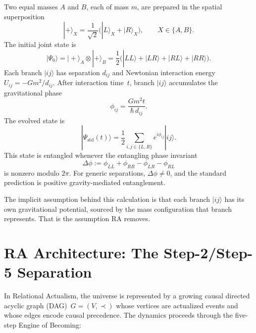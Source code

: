 \documentclass[12pt,a4paper]{article}
\begin{document}
Two equal masses $A$ and $B$, each of mass $m$, are prepared in the
spatial superposition
\begin{equation}
|{+}\rangle_X = \frac{1}{\sqrt{2}}
\bigl(|L\rangle_X + |R\rangle_X\bigr),
\qquad X \in \{A,B\}.
\end{equation}
The initial joint state is
\begin{equation}
|\Psi_0\rangle = |{+}\rangle_A \otimes |{+}\rangle_B
= \frac{1}{2}\bigl(|LL\rangle + |LR\rangle + |RL\rangle
+ |RR\rangle\bigr).
\end{equation}
Each branch $|ij\rangle$ has separation $d_{ij}$ and Newtonian
interaction energy $U_{ij} = -Gm^2/d_{ij}$. After interaction
time~$t$, branch $|ij\rangle$ accumulates the gravitational phase
\begin{equation}
\phi_{ij} = \frac{Gm^2 t}{\hbar\, d_{ij}}.
\end{equation}
The evolved state is
\begin{equation}
|\Psi_{\mathrm{std}}(t)\rangle
= \frac{1}{2}\sum_{i,j \in \{L,R\}} e^{i\phi_{ij}} |ij\rangle.
\end{equation}
This state is entangled whenever the entangling phase invariant
\begin{equation}
\Delta\phi := \phi_{LL} + \phi_{RR} - \phi_{LR} - \phi_{RL}
\end{equation}
is nonzero modulo $2\pi$. For generic separations,
$\Delta\phi \neq 0$, and the standard prediction is positive
gravity-mediated entanglement.

The implicit assumption behind this calculation is that each branch
$|ij\rangle$ has its own gravitational potential, sourced by the
mass configuration that branch represents. That is the assumption
RA removes.

\section{RA Architecture: The Step-2/Step-5 Separation}
\label{sec:architecture}

In Relational Actualism, the universe is represented by a growing
causal directed acyclic graph (DAG)~$G = (V, \prec)$ whose vertices
are actualized events and whose edges encode causal precedence. The
dynamics proceeds through the five-step Engine of Becoming:
\end{document}
